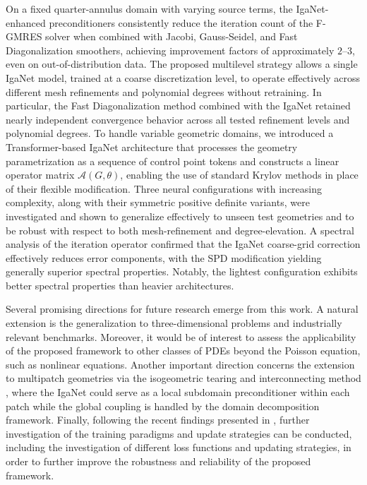 \documentclass{article}
\theoremstyle{plain}
\numberwithin{equation}{section}
\begin{document}
On a fixed quarter-annulus domain with varying source terms, the IgaNet-enhanced preconditioners consistently reduce the iteration count of the F-GMRES solver when combined with Jacobi, Gauss-Seidel, and Fast Diagonalization smoothers, achieving improvement factors of approximately $2$--$3$, even on out-of-distribution data.
The proposed multilevel strategy allows a single IgaNet model, trained at a coarse discretization level, to operate effectively across different mesh refinements and polynomial degrees without retraining. In particular, the Fast Diagonalization method combined with the IgaNet retained nearly independent convergence behavior across all tested refinement levels and polynomial degrees.
To handle variable geometric domains, we introduced a Transformer-based IgaNet architecture that processes the geometry parametrization as a sequence of control point tokens and constructs a linear operator matrix $\mathcal{A}(G, \theta)$, enabling the use of standard Krylov methods in place of their flexible modification. Three neural configurations with increasing complexity, along with their symmetric positive definite variants, were investigated and shown to generalize effectively to unseen test geometries and to be robust with respect to both mesh-refinement and degree-elevation.
A spectral analysis of the iteration operator confirmed that the IgaNet coarse-grid correction effectively reduces error components, with the SPD modification yielding generally superior spectral properties. Notably, the lightest configuration exhibits better spectral properties than heavier architectures.

Several promising directions for future research emerge from this work.
A natural extension is the generalization to three-dimensional problems and industrially relevant benchmarks.
Moreover, it would be of interest to assess the applicability of the proposed framework to other classes of PDEs beyond the Poisson equation, such as nonlinear equations.
Another important direction concerns the extension to multipatch geometries via the isogeometric tearing and interconnecting method \cite{kleiss2012ieti}, where the IgaNet could serve as a local subdomain preconditioner within each patch while the global coupling is handled by the domain decomposition framework.
Finally, following the recent findings presented in \cite{wu2026dlhim}, further investigation of the training paradigms and update strategies can be conducted, including the investigation of different loss functions and updating strategies, in order to further improve the robustness and reliability of the proposed framework.
\end{document}

